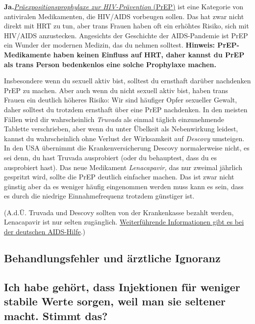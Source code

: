 \documentclass{article}
\begin{document}
\textbf{Ja.}\href{https://de.wikipedia.org/wiki/Pr%C3%A4expositionsprophylaxe}{\textit{Präexpositionsprophylaxe zur HIV-Prävention} (PrEP)} ist eine Kategorie von antiviralen Medikamenten, die HIV/AIDS vorbeugen sollen. Das hat zwar nicht direkt mit HRT zu tun, aber trans Frauen haben oft ein erhöhtes Risiko, sich mit HIV/AIDS anzustecken. Angesichts der Geschichte der AIDS-Pandemie ist PrEP ein Wunder der modernen Medizin, das du nehmen solltest. \textbf{Hinweis: PrEP-Medikamente haben keinen Einfluss auf HRT, daher kannst du PrEP als trans Person bedenkenlos eine solche Prophylaxe machen.}

Insbesondere wenn du sexuell aktiv bist, solltest du ernsthaft darüber nachdenken PrEP zu machen. Aber auch wenn du nicht sexuell aktiv bist, haben trans Frauen ein deutlich höheres Risiko: Wir sind häufiger Opfer sexueller Gewalt, daher solltest du trotzdem ernsthaft über eine PrEP nachdenken. In den meisten Fällen wird dir wahrscheinlich \textit{Truvada} als einmal täglich einzunehmende Tablette verschrieben, aber wenn du unter Übelkeit als Nebenwirkung leidest, kannst du wahrscheinlich ohne Verlust der Wirksamkeit auf \textit{Descovy} umsteigen. In den USA übernimmt die Krankenversicherung Descovy normalerweise nicht, es sei denn, du hast Truvada ausprobiert (oder du behauptest, dass du es ausprobiert hast). Das neue Medikament \textit{Lenacapavir,} das nur zweimal jährlich gespritzt wird, sollte die PrEP deutlich einfacher machen. Das ist zwar nicht günstig aber da es weniger häufig eingenommen werden muss kann es sein, dass es durch die niedrige Einnahmefrequenz trotzdem günstiger ist.

(A.d.Ü. Truvada und Descovy sollten von der Krankenkasse bezahlt werden, Lenacapavir ist nur selten zugänglich. \href{https://www.aidshilfe.de/de/hiv-prep/prep-praxen-finden-kosten}{Weiterführende Informationen gibt es bei der deutschen AIDS-Hilfe}.)

\subsection*{Behandlungsfehler und ärztliche Ignoranz}

\subsection{Ich habe gehört, dass Injektionen für weniger stabile Werte sorgen, weil man sie seltener macht. Stimmt das?}
\end{document}
